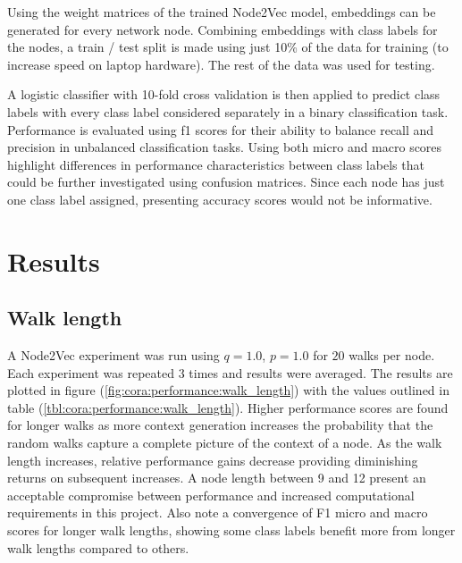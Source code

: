 \documentclass[a4paper,10pt]{article}
\begin{document}
Using the weight matrices of the trained Node2Vec model, embeddings can be generated for every network node. Combining embeddings with class labels for the nodes, a train / test split is made using just 10\% of the data for training (to increase speed on laptop hardware). The rest of the data was used for testing.

A logistic classifier with 10-fold cross validation is then applied to predict class labels with every class label considered separately in a binary classification task. Performance is evaluated using f1 scores for their ability to balance recall and precision in unbalanced classification tasks. Using both micro and macro scores highlight differences in performance characteristics between class labels that could be further investigated using confusion matrices. Since each node has just one class label assigned, presenting accuracy scores would not be informative.


\section{Results}

\subsection{Walk length}

A Node2Vec experiment was run using $q = 1.0$, $p = 1.0$ for $20$ walks per node. Each experiment was repeated $3$ times and results were averaged. The results are plotted in figure (\ref{fig:cora:performance:walk_length}) with the values outlined in table (\ref{tbl:cora:performance:walk_length}). Higher performance scores are found for longer walks as more context generation increases the probability that the random walks capture a complete picture of the context of a node. As the walk length increases, relative performance gains decrease providing diminishing returns on subsequent increases. A node length between 9 and 12 present an acceptable compromise between performance and increased computational requirements in this project. Also note a convergence of F1 micro and macro scores for longer walk lengths, showing some class labels benefit more from longer walk lengths compared to others.

\vspace{1em}


\end{document}
